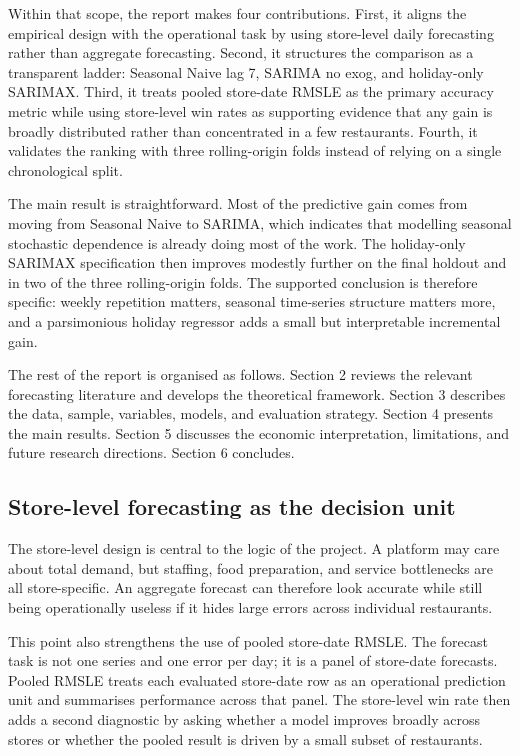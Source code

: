 \documentclass[11pt,oneside]{scrartcl}
\begin{document}
Within that scope, the report makes four contributions. First, it aligns the empirical design with the operational task by using store-level daily forecasting rather than aggregate forecasting. Second, it structures the comparison as a transparent ladder: Seasonal Naive lag 7, SARIMA no exog, and holiday-only SARIMAX. Third, it treats pooled store-date RMSLE as the primary accuracy metric while using store-level win rates as supporting evidence that any gain is broadly distributed rather than concentrated in a few restaurants. Fourth, it validates the ranking with three rolling-origin folds instead of relying on a single chronological split.

The main result is straightforward. Most of the predictive gain comes from moving from Seasonal Naive to SARIMA, which indicates that modelling seasonal stochastic dependence is already doing most of the work. The holiday-only SARIMAX specification then improves modestly further on the final holdout and in two of the three rolling-origin folds. The supported conclusion is therefore specific: weekly repetition matters, seasonal time-series structure matters more, and a parsimonious holiday regressor adds a small but interpretable incremental gain.

The rest of the report is organised as follows. Section 2 reviews the relevant forecasting literature and develops the theoretical framework. Section 3 describes the data, sample, variables, models, and evaluation strategy. Section 4 presents the main results. Section 5 discusses the economic interpretation, limitations, and future research directions. Section 6 concludes.

\subsection{Store-level forecasting as the decision unit}
The store-level design is central to the logic of the project. A platform may care about total demand, but staffing, food preparation, and service bottlenecks are all store-specific. An aggregate forecast can therefore look accurate while still being operationally useless if it hides large errors across individual restaurants.

This point also strengthens the use of pooled store-date RMSLE. The forecast task is not one series and one error per day; it is a panel of store-date forecasts. Pooled RMSLE treats each evaluated store-date row as an operational prediction unit and summarises performance across that panel. The store-level win rate then adds a second diagnostic by asking whether a model improves broadly across stores or whether the pooled result is driven by a small subset of restaurants.
\end{document}
